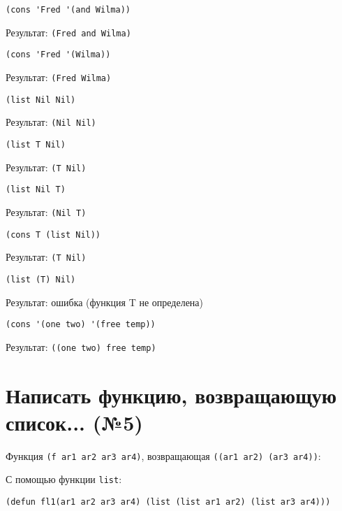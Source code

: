 \begin{lstlisting}
(cons 'Fred '(and Wilma))
\end{lstlisting}
Результат: \texttt{(Fred and Wilma)}
\vspace{20mm}

\begin{lstlisting}
(cons 'Fred '(Wilma))
\end{lstlisting}
Результат: \texttt{(Fred Wilma)}
\vspace{20mm}

\begin{lstlisting}
(list Nil Nil)
\end{lstlisting}
Результат: \texttt{(Nil Nil)}
\vspace{20mm}

\begin{lstlisting}
(list T Nil)
\end{lstlisting}
Результат: \texttt{(T Nil)}
\vspace{20mm}

\begin{lstlisting}
(list Nil T)
\end{lstlisting}
Результат: \texttt{(Nil T)}
\vspace{20mm}

\begin{lstlisting}
(cons T (list Nil))
\end{lstlisting}
Результат: \texttt{(T Nil)}
\vspace{20mm}

\begin{lstlisting}
(list (T) Nil)
\end{lstlisting}
Результат: ошибка (функция T не определена)
\vspace{20mm}

\begin{lstlisting}
(cons '(one two) '(free temp))
\end{lstlisting}
Результат: \texttt{((one two) free temp)}
\vspace{20mm}

\section{Написать функцию, возвращающую список... (№5)}

Функция \texttt{(f ar1 ar2 ar3 ar4)}, возвращающая \texttt{((ar1 ar2) (ar3 ar4))}:

С помощью функции \texttt{list}:
\begin{lstlisting}
(defun fl1(ar1 ar2 ar3 ar4) (list (list ar1 ar2) (list ar3 ar4)))
\end{lstlisting}

